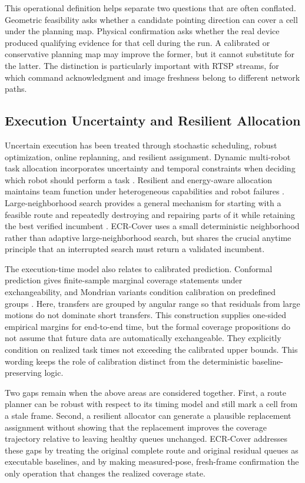 This operational definition helps separate two questions that are often conflated. Geometric feasibility asks whether a candidate pointing direction can cover a cell under the planning map. Physical confirmation asks whether the real device produced qualifying evidence for that cell during the run. A calibrated or conservative planning map may improve the former, but it cannot substitute for the latter. The distinction is particularly important with RTSP streams, for which command acknowledgment and image freshness belong to different network paths.

\subsection{Execution Uncertainty and Resilient Allocation}

Uncertain execution has been treated through stochastic scheduling, robust optimization, online replanning, and resilient assignment. Dynamic multi-robot task allocation incorporates uncertainty and temporal constraints when deciding which robot should perform a task \cite{choudhury2022dynamic}. Resilient and energy-aware allocation maintains team function under heterogeneous capabilities and robot failures \cite{notomista2022resilient}. Large-neighborhood search provides a general mechanism for starting with a feasible route and repeatedly destroying and repairing parts of it while retaining the best verified incumbent \cite{ropke2006alns}. ECR-Cover uses a small deterministic neighborhood rather than adaptive large-neighborhood search, but shares the crucial anytime principle that an interrupted search must return a validated incumbent.

The execution-time model also relates to calibrated prediction. Conformal prediction gives finite-sample marginal coverage statements under exchangeability, and Mondrian variants condition calibration on predefined groups \cite{angelopoulos2023conformal,bostrom2021mondrian}. Here, transfers are grouped by angular range so that residuals from large motions do not dominate short transfers. This construction supplies one-sided empirical margins for end-to-end time, but the formal coverage propositions do not assume that future data are automatically exchangeable. They explicitly condition on realized task times not exceeding the calibrated upper bounds. This wording keeps the role of calibration distinct from the deterministic baseline-preserving logic.

Two gaps remain when the above areas are considered together. First, a route planner can be robust with respect to its timing model and still mark a cell from a stale frame. Second, a resilient allocator can generate a plausible replacement assignment without showing that the replacement improves the coverage trajectory relative to leaving healthy queues unchanged. ECR-Cover addresses these gaps by treating the original complete route and original residual queues as executable baselines, and by making measured-pose, fresh-frame confirmation the only operation that changes the realized coverage state.

